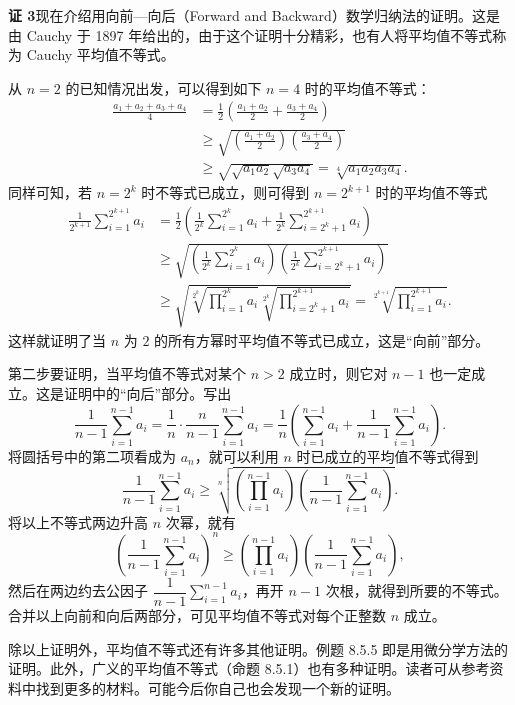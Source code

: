 \begin{xproof}
\textbf{证 3}\quad 现在介绍用向前—向后（Forward and Backward）数学归纳法的证明。这是由 Cauchy 于 1897 年给出的，由于这个证明十分精彩，也有人将平均值不等式称为 Cauchy 平均值不等式。

从 $n=2$ 的已知情况出发，可以得到如下 $n=4$ 时的平均值不等式：
\[
\begin{aligned}
  \frac{a_1+a_2+a_3+a_4}{4}
  &=\frac12\left(\frac{a_1+a_2}{2}+\frac{a_3+a_4}{2}\right)\\
  &\ge \sqrt{\left(\frac{a_1+a_2}{2}\right)\left(\frac{a_3+a_4}{2}\right)}\\
  &\ge \sqrt{\sqrt{a_1a_2}\sqrt{a_3a_4}}
   =\sqrt[4]{a_1a_2a_3a_4}.
\end{aligned}
\]
同样可知，若 $n=2^k$ 时不等式已成立，则可得到 $n=2^{k+1}$ 时的平均值不等式
\[
\begin{aligned}
  \frac{1}{2^{k+1}}\sum_{i=1}^{2^{k+1}}a_i
  &=\frac12\left(
    \frac1{2^k}\sum_{i=1}^{2^k}a_i
    +\frac1{2^k}\sum_{i=2^k+1}^{2^{k+1}}a_i
  \right)\\
  &\ge \sqrt{
    \left(\frac1{2^k}\sum_{i=1}^{2^k}a_i\right)
    \left(\frac1{2^k}\sum_{i=2^k+1}^{2^{k+1}}a_i\right)
  }\\
  &\ge \sqrt{
    \sqrt[2^k]{\prod_{i=1}^{2^k}a_i}
    \sqrt[2^k]{\prod_{i=2^k+1}^{2^{k+1}}a_i}
  }
  =\sqrt[2^{k+1}]{\prod_{i=1}^{2^{k+1}}a_i}.
\end{aligned}
\]
这样就证明了当 $n$ 为 $2$ 的所有方幂时平均值不等式已成立，这是“向前”部分。

第二步要证明，当平均值不等式对某个 $n>2$ 成立时，则它对 $n-1$ 也一定成立。这是证明中的“向后”部分。写出
\[
  \frac1{n-1}\sum_{i=1}^{n-1}a_i
  =\frac1n\cdot\frac n{n-1}\sum_{i=1}^{n-1}a_i
  =\frac1n\left(
    \sum_{i=1}^{n-1}a_i
    +\frac1{n-1}\sum_{i=1}^{n-1}a_i
  \right).
\]
将圆括号中的第二项看成为 $a_n$，就可以利用 $n$ 时已成立的平均值不等式得到
\[
  \frac1{n-1}\sum_{i=1}^{n-1}a_i
  \ge
  \sqrt[n]{
    \left(\prod_{i=1}^{n-1}a_i\right)
    \left(\frac1{n-1}\sum_{i=1}^{n-1}a_i\right)
  }.
\]
将以上不等式两边升高 $n$ 次幂，就有
\[
  \left(\frac1{n-1}\sum_{i=1}^{n-1}a_i\right)^n
  \ge
  \left(\prod_{i=1}^{n-1}a_i\right)
  \left(\frac1{n-1}\sum_{i=1}^{n-1}a_i\right),
\]
然后在两边约去公因子 $\dfrac1{n-1}\sum_{i=1}^{n-1}a_i$，再开 $n-1$ 次根，就得到所要的不等式。合并以上向前和向后两部分，可见平均值不等式对每个正整数 $n$ 成立。
\end{xproof}

\begin{xremark}
除以上证明外，平均值不等式还有许多其他证明。例题 8.5.5 即是用微分学方法的证明。此外，广义的平均值不等式（命题 8.5.1）也有多种证明。读者可从参考资料中找到更多的材料。可能今后你自己也会发现一个新的证明。
\end{xremark}

